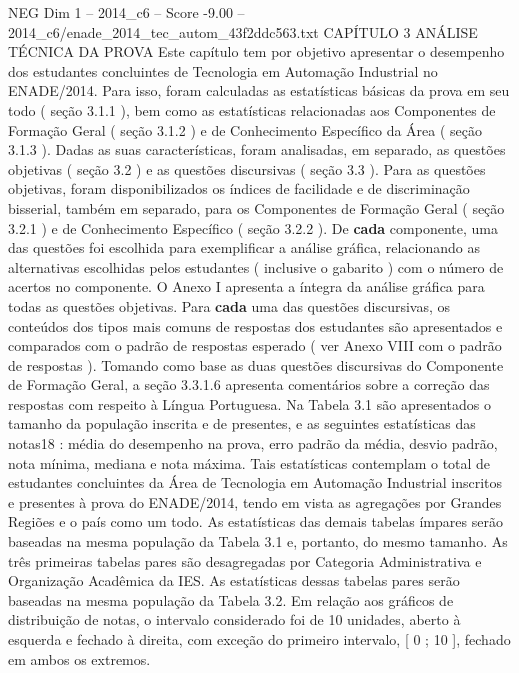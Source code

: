 \begin{textsample}{NEG Dim 1 – 2014\_c6 – Score -9.00 – 2014\_c6/enade\_2014\_tec\_autom\_43f2ddc563.txt}  \label{ex:f1_neg_008}
CAPÍTULO 3 ANÁLISE TÉCNICA DA PROVA Este capítulo tem por objetivo apresentar o desempenho dos estudantes concluintes de Tecnologia em Automação Industrial no ENADE/2014.
Para isso, foram calculadas as estatísticas básicas da prova em seu todo ( seção 3.1.1 ), bem como as estatísticas relacionadas aos Componentes de Formação Geral ( seção 3.1.2 ) e de Conhecimento Específico da Área ( seção 3.1.3 ).
Dadas as suas características, foram analisadas, em separado, as questões objetivas ( seção 3.2 ) e as questões discursivas ( seção 3.3 ).
Para as questões objetivas, foram disponibilizados os índices de facilidade e de discriminação bisserial, também em separado, para os Componentes de Formação Geral ( seção 3.2.1 ) e de Conhecimento Específico ( seção 3.2.2 ).
De \textbf{cada} componente, uma das questões foi escolhida para exemplificar a análise gráfica, relacionando as alternativas escolhidas pelos estudantes ( inclusive o gabarito ) com o número de acertos no componente.
O Anexo I apresenta a íntegra da análise gráfica para todas as questões objetivas.
Para \textbf{cada} uma das questões discursivas, os conteúdos dos tipos mais comuns de respostas dos estudantes são apresentados e comparados com o padrão de respostas esperado ( ver Anexo VIII com o padrão de respostas ).
Tomando como base as duas questões discursivas do Componente de Formação Geral, a seção 3.3.1.6 apresenta comentários sobre a correção das respostas com respeito à Língua Portuguesa.
Na Tabela 3.1 são apresentados o tamanho da população inscrita e de presentes, e as seguintes estatísticas das notas18 : média do desempenho na prova, erro padrão da média, desvio padrão, nota mínima, mediana e nota máxima.
Tais estatísticas contemplam o total de estudantes concluintes da Área de Tecnologia em Automação Industrial inscritos e presentes à prova do ENADE/2014, tendo em vista as agregações por Grandes Regiões e o país como um todo.
As estatísticas das demais tabelas ímpares serão baseadas na mesma população da Tabela 3.1 e, portanto, do mesmo tamanho.
As três primeiras tabelas pares são desagregadas por Categoria Administrativa e Organização Acadêmica da IES.
As estatísticas dessas tabelas pares serão baseadas na mesma população da Tabela 3.2.
Em relação aos gráficos de distribuição de notas, o intervalo considerado foi de 10 unidades, aberto à esquerda e fechado à direita, com exceção do primeiro intervalo, [ 0 ; 10 ], fechado em ambos os extremos.

\end{textsample}
